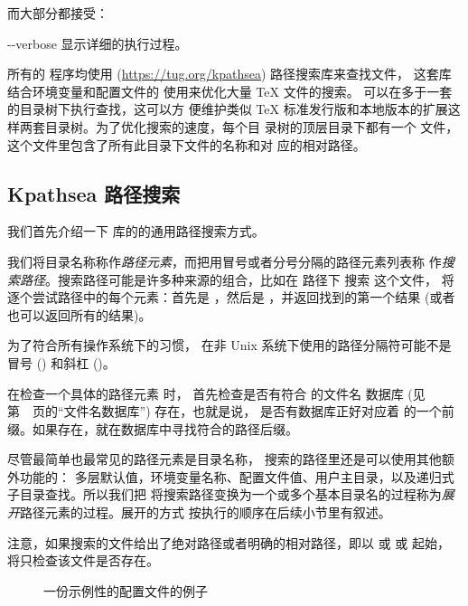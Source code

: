\documentclass{article}
\begin{document}
而大部分都接受：
\begin{ttdescription}
\item[-{}-verbose] 显示详细的执行过程。
\end{ttdescription}

所有的 \Webc{} 程序均使用 \KPS{} (\url{https://tug.org/kpathsea}) 路径搜索库来查找文件，
这套库结合环境变量和配置文件的
使用来优化大量 \TeX{} 文件的搜索。\Webc{} 可以在多于一套的目录树下执行查找，这可以方
便维护类似 \TeX{} 标准发行版和本地版本的扩展这样两套目录树。为了优化搜索的速度，每个目
录树的顶层目录下都有一个  文件，这个文件里包含了所有此目录下文件的名称和对
应的相对路径。

\subsection{Kpathsea 路径搜索}
\label{sec:kpathsea}

我们首先介绍一下 \KPS{} 库的的通用路径搜索方式。

我们将目录名称称作\emph{路径元素}，而把用冒号或者分号分隔的路径元素列表称
作\emph{搜索路径}。搜索路径可能是许多种来源的组合，比如在  路径下
搜索  这个文件，\KPS{} 将逐个尝试路径中的每个元素：首先是
，然后是 ，并返回找到的第一个结果 (或者
也可以返回所有的结果)。

为了符合所有操作系统下的习惯，\KPS{} 在非 Unix 系统下使用的路径分隔符可能不是冒号
(\samp{:}) 和斜杠 (\samp{/})。

在检查一个具体的路径元素  时，\KPS{} 首先检查是否有符合  的文件名
数据库 (见第~\pageref{sec:filename-database}~页的``文件名数据库'') 存在，也就是说，
是否有数据库正好对应着  的一个前缀。如果存在，就在数据库中寻找符合的路径后缀。

尽管最简单也最常见的路径元素是目录名称，\KPS{} 搜索的路径里还是可以使用其他额外功能的：
多层默认值，环境变量名称、配置文件值、用户主目录，以及递归式子目录查找。所以我们把 \KPS{}
将搜索路径变换为一个或多个基本目录名的过程称为\emph{展开}路径元素的过程。展开的方式
按执行的顺序在后续小节里有叙述。

注意，如果搜索的文件给出了绝对路径或者明确的相对路径，即以 \samp{/} 或  或
 起始，\KPS{} 将只检查该文件是否存在。

\ifSingleColumn
\else
\begin{figure*}

\setlength{\abovecaptionskip}{0pt}
  \caption{一份示例性的配置文件的例子}
  \label{fig:config-sample}
\end{figure*}
\fi
\end{document}
